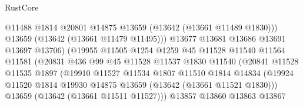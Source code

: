\begin{lexlean}{RustCore}
\begin{coremodule}
                                        @11488
                                        @1814
                                        @20801
                                        @14875
                                        @13659
                                        (@13642 (@13661 @11489 @1830)))
                                      @13659
                                      (@13642 (@13661 @11479 @11495)))
                                    @13677
                                    @13681
                                    @13686
                                    @13691
                                    @13697
                                    @13706)
                                  (@19955
                                    @11505
                                    @1254
                                    @1259
                                    @45
                                    @11528
                                    @11540
                                    @11564
                                    @11581
                                    (@20831
                                      @436
                                      @99
                                      @45
                                      @11528
                                      @11537
                                      @1830
                                      @11540
                                      (@20841
                                        @11528
                                        @11535
                                        @1897
                                        (@19910
                                          @11527
                                          @11534
                                          @1807
                                          @11510
                                          @1814
                                          @14834
                                          (@19924
                                            @11520
                                            @1814
                                            @19930
                                            @14875
                                            @13659
                                            (@13642 (@13661 @11521 @1830)))
                                          @13659
                                          (@13642 (@13661 @11511 @11527)))
                                        @13857
                                        @13860
                                        @13863
                                        @13867

\end{coremodule}
\end{lexlean}
